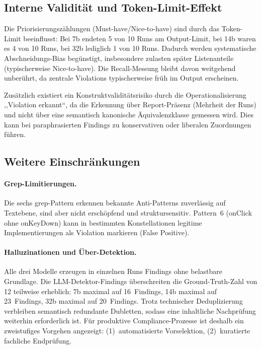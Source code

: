 \subsection{Interne Validität und Token-Limit-Effekt}
\label{sec:limit_tokenlimit}

Die Priorisierungszählungen (Must-have/Nice-to-have) sind durch das Token-Limit beeinflusst: Bei 7b endeten 5 von 10 Runs am Output-Limit, bei 14b waren es 4 von 10 Runs, bei 32b lediglich 1 von 10 Runs. Dadurch werden systematische Abschneidungs-Bias begünstigt, insbesondere zulasten später Listenanteile (typischerweise Nice-to-have). Die Recall-Messung bleibt davon weitgehend unberührt, da zentrale Violations typischerweise früh im Output erscheinen.

Zusätzlich existiert ein Konstruktvaliditätsrisiko durch die Operationalisierung ,,Violation erkannt``, da die Erkennung über Report-Präsenz (Mehrheit der Runs) und nicht über eine semantisch kanonische Äquivalenzklasse gemessen wird. Dies kann bei paraphrasierten Findings zu konservativen oder liberalen Zuordnungen führen.

\subsection{Weitere Einschränkungen}
\label{sec:limit_weitere}

\paragraph{Grep-Limitierungen.}
Die sechs grep-Pattern erkennen bekannte Anti-Patterns zuverlässig auf Textebene, sind aber nicht erschöpfend und struktursensitiv. Pattern~6 (onClick ohne onKeyDown) kann in bestimmten Konstellationen legitime Implementierungen als Violation markieren (False Positive).

\paragraph{Halluzinationen und Über-Detektion.}
Alle drei Modelle erzeugen in einzelnen Runs Findings ohne belastbare Grundlage. Die \ac{LLM}-Detektor-Findings überschreiten die Ground-Truth-Zahl von 12 teilweise erheblich: 7b maximal auf 16~Findings, 14b maximal auf 23~Findings, 32b maximal auf 20~Findings. Trotz technischer Deduplizierung verbleiben semantisch redundante Dubletten, sodass eine inhaltliche Nachprüfung weiterhin erforderlich ist. Für produktive Compliance-Prozesse ist deshalb ein zweistufiges Vorgehen angezeigt: (1)~automatisierte Vorselektion, (2)~kuratierte fachliche Endprüfung.

